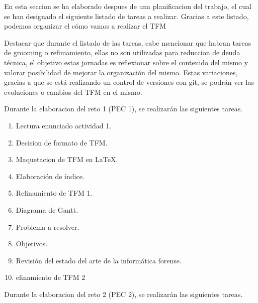 En esta seccion se ha elaborado despues de una planificacion del trabajo, el cual se han designado el siguiente listado de tareas a realizar. Gracias a este listado, podemos organizar el cómo vamos a realizar el TFM

Destacar que durante el listado de las tareas, cabe mencionar que habran tareas de grooming o refimamiento, ellas no son utilizadas para reduccion de deuda técnica, el objetivo estas jornadas es reflexionar sobre el contenido del mismo y valorar posibilidad de mejorar la organización del mismo. Estas variaciones, gracias a que se está realizando un control de versiones con git, se podrán ver las evoluciones o cambios del TFM en el mismo.


\noindent Durante la elaboracion del reto 1 (PEC 1), se realizarán las siguientes tareas.

\begin{enumerate}
    \item Lectura enunciado actividad 1.
    \item Decision de formato de TFM.
    \item Maquetacion de TFM en LaTeX.
    \item Elaboración de índice.
    \item Refinamiento de TFM 1.
    \item Diagrama de Gantt.
    \item Problema a resolver.
    \item Objetivos.
    \item Revisión del estado del arte de la informática forense.
    \item efinamiento de TFM 2
\end{enumerate}



\noindent Durante la elaboracion del reto 2 (PEC 2), se realizarán las siguientes tareas.

